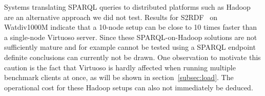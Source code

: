 Systems translating SPARQL queries to distributed platforms such as Hadoop~\cite{cure2015evaluation, graux2016multi} are an alternative approach we did not test. 
Results for S2RDF~\cite{Schatzle:2016:SRQ:2977797.2977806} on Watdiv1000M indicate that a 10-node setup can be close to 10 times faster than a single-node Virtuoso server. Since these SPARQL-on-Hadoop solutions are not sufficiently mature and for example cannot be tested using a SPARQL endpoint definite conclusions can currently not be drawn. One observation to motivate this caution is the fact that Virtuoso is hardly affected when running multiple benchmark clients at once, as will be shown in section~\ref{subsec:load}. The operational cost for these Hadoop setups can also not immediately be deduced.